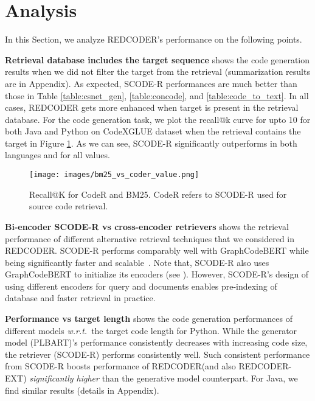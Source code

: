 \documentclass[11pt]{article}
\newcommand{\tool}{{REDCODER}\xspace}
\newcommand{\toolext}{{REDCODER-EXT}\xspace}
\newcommand{\coder}{SCODE-R\xspace}
\newcommand{\wrt}{\textit{w.r.t.}~}
\begin{document}
     \section{Analysis}
\label{sec:analysis}
In this Section, we analyze REDCODER's performance on the following points.

\smallskip\noindent\textbf{Retrieval database includes the target sequence\hspace{0.5em}}
 shows the code generation  results when we did not filter the target from the retrieval (summarization results are in Appendix). As expected, \coder performances are much  better than those in Table \ref{table:csnet_gen}, \ref{table:concode}, and \ref{table:code_to_text}. In all cases, \tool gets more enhanced when target is present in the retrieval database. 
For the code generation task, we plot the recall@k curve for  upto 10 for both Java and Python on CodeXGLUE dataset when the retrieval contains the target in Figure \ref{fig:recall-bm25-coder}. As we can see,  \coder significantly outperforms in both languages and for all  values.


\begin{figure}[t]
\centering
\texttt{[image: images/bm25\_vs\_coder\_value.png]}
\caption{ Recall@K for  CodeR and BM25. CodeR refers to \coder used for source code retrieval.} 
\vspace{-2mm}
\label{fig:recall-bm25-coder}
\end{figure}






\smallskip\noindent\textbf{Bi-encoder \coder vs cross-encoder retrievers\hspace{0.5em}}
 shows the retrieval performance of different alternative retrieval techniques that we considered in \tool. \coder performs comparably well with GraphCodeBERT while being significantly faster and scalable~\cite{Humeau2020Poly-encoders:}. Note that, \coder also uses GraphCodeBERT to initialize its encoders (see ). However, \coder's design of using different encoders for query and documents enables pre-indexing of database and faster retrieval in practice.  





\smallskip\noindent\textbf{Performance vs target length\hspace{0.5em}}
 shows the code generation performances of different models \wrt the target code length for Python. While the generator model (PLBART)'s performance consistently decreases with increasing code size, the retriever (\coder) performs consistently well. Such consistent performance from \coder boosts performance of \tool (and also \toolext) {\em significantly higher} than the generative model counterpart. For Java, we find similar results (details in Appendix).
\end{document}
